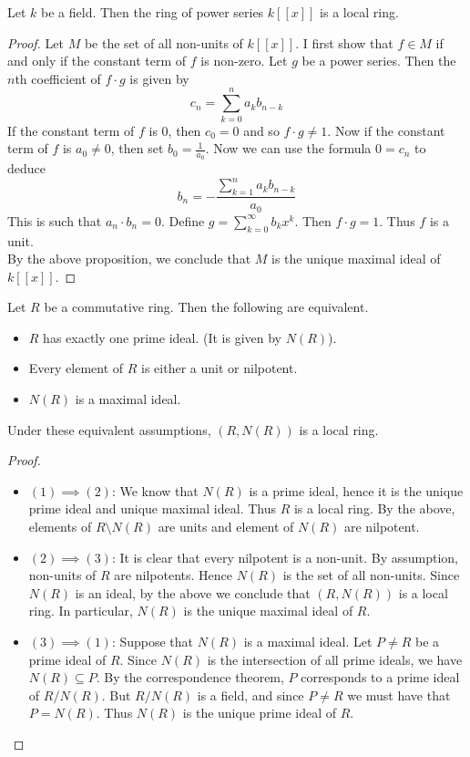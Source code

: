 \documentclass[a4paper]{article}
\begin{document}
\begin{eg}{}{} Let $k$ be a field. Then the ring of power series $k[[x]]$ is a local ring. 
\begin{proof}
Let $M$ be the set of all non-units of $k[[x]]$. I first show that $f\in M$ if and only if the constant term of $f$ is non-zero. Let $g$ be a power series. Then the $n$th coefficient of $f\cdot g$ is given by $$c_n=\sum_{k=0}^na_kb_{n-k}$$ If the constant term of $f$ is $0$, then $c_0=0$ and so $f\cdot g\neq 1$. Now if the constant term of $f$ is $a_0\neq 0$, then set $b_0=\frac{1}{a_0}$. Now we can use the formula $0=c_n$ to deduce $$b_n=-\frac{\sum_{k=1}^na_kb_{n-k}}{a_0}$$ This is such that $a_n\cdot b_n=0$. Define $g=\sum_{k=0}^\infty b_kx^k$. Then $f\cdot g=1$. Thus $f$ is a unit. \\

By the above proposition, we conclude that $M$ is the unique maximal ideal of $k[[x]]$. 
\end{proof}
\end{eg}

\begin{prp}{}{} Let $R$ be a commutative ring. Then the following are equivalent. 
\begin{itemize}
\item $R$ has exactly one prime ideal. (It is given by $N(R)$).
\item Every element of $R$ is either a unit or nilpotent. 
\item $N(R)$ is a maximal ideal. 
\end{itemize}
Under these equivalent assumptions, $(R,N(R))$ is a local ring. 
\begin{proof}\\
\begin{itemize}
\item $(1)\implies(2)$: We know that $N(R)$ is a prime ideal, hence it is the unique prime ideal and unique maximal ideal. Thus $R$ is a local ring. By the above, elements of $R\setminus N(R)$ are units and element of $N(R)$ are nilpotent. 
\item $(2)\implies(3)$: It is clear that every nilpotent is a non-unit. By assumption, non-units of $R$ are nilpotents. Hence $N(R)$ is the set of all non-units. Since $N(R)$ is an ideal, by the above we conclude that $(R,N(R))$ is a local ring. In particular, $N(R)$ is the unique maximal ideal of $R$. 
\item $(3)\implies(1)$: Suppose that $N(R)$ is a maximal ideal. Let $P\neq R$ be a prime ideal of $R$. Since $N(R)$ is the intersection of all prime ideals, we have $N(R)\subseteq P$. By the correspondence theorem, $P$ corresponds to a prime ideal of $R/N(R)$. But $R/N(R)$ is a field, and since $P\neq R$ we must have that $P=N(R)$. Thus $N(R)$ is the unique prime ideal of $R$. 
\end{itemize}
\end{proof}
\end{prp}
\end{document}
